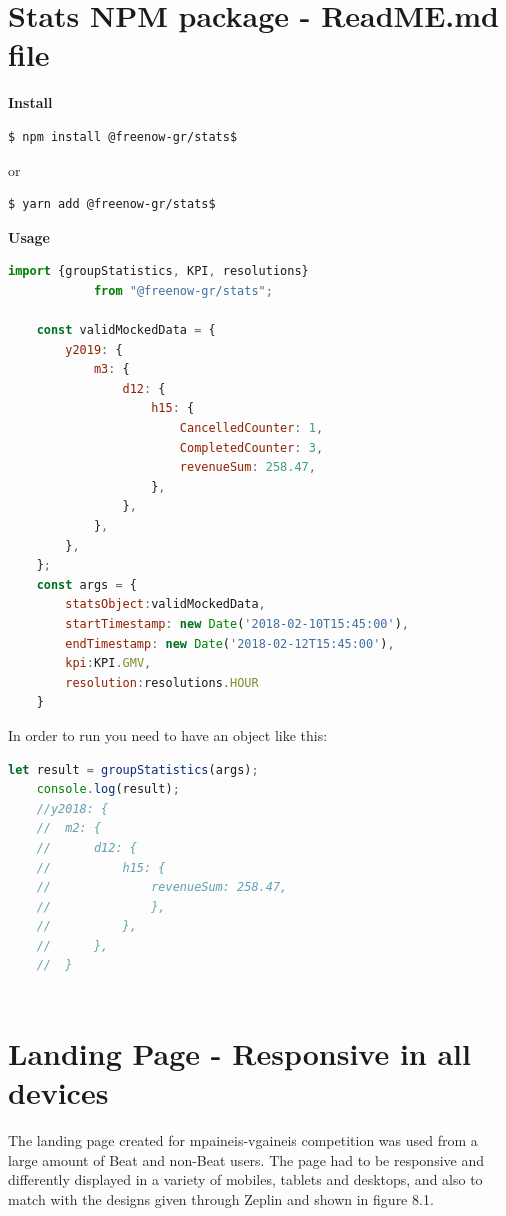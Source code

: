 \section{Stats NPM package - ReadME.md file}
	\textbf{Install}
	
	\begin{lstlisting}[language=bash]
	$ npm install @freenow-gr/stats$
	\end{lstlisting}
	
	or
	
	\begin{lstlisting}[language=bash]
	$ yarn add @freenow-gr/stats$
	\end{lstlisting}

	\textbf{Usage}
	
	\begin{lstlisting}[language=JavaScript]
	import {groupStatistics, KPI, resolutions} 
			from "@freenow-gr/stats";
	
	const validMockedData = {
		y2019: {
			m3: {
				d12: {
					h15: {
						CancelledCounter: 1,
						CompletedCounter: 3,
						revenueSum: 258.47,
					},
				},
			},
		},
	};	
	const args = {
		statsObject:validMockedData, 
		startTimestamp: new Date('2018-02-10T15:45:00'), 
		endTimestamp: new Date('2018-02-12T15:45:00'), 
		kpi:KPI.GMV, 
		resolution:resolutions.HOUR
	}
	\end{lstlisting}
	
	\newpage
	In order to run you need to have an object like this:
	
	\begin{lstlisting}[language=JavaScript]
	let result = groupStatistics(args);
	console.log(result);
	//y2018: {
	//	m2: {
	//		d12: {
	//			h15: {
	//				revenueSum: 258.47,
	//				},
	//			},
	//		},
	//	}
	
	\end{lstlisting}
	
	
\section{Landing Page - Responsive in all devices}

The landing page created for mpaineis-vgaineis competition was used from a large amount of Beat and non-Beat users. The page had to be responsive and differently displayed in a variety of mobiles, tablets and desktops, and also to match with the designs given through Zeplin and shown in figure 8.1.

